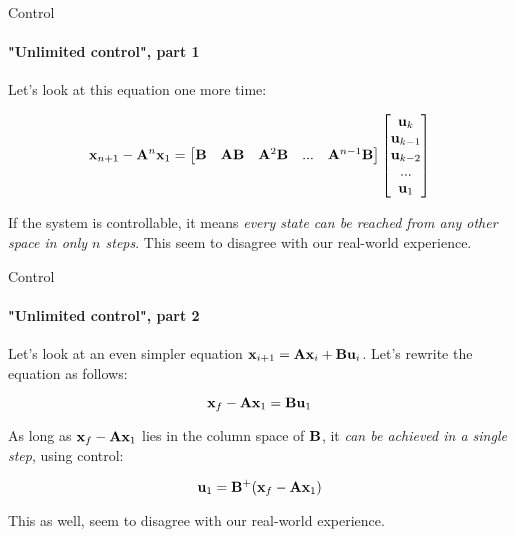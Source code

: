 \documentclass{beamer}
\begin{document}
\begin{frame}{Control}
\framesubtitle{"Unlimited control", part 1}
\begin{flushleft}

Let's look at this equation one more time:

\begin{equation}
    \mathbf{x}_{n+1} - \mathbf{A}^n \mathbf{x}_1 = 
    \begin{bmatrix}
    \mathbf{B} &
    \mathbf{A} \mathbf{B} &
    \mathbf{A}^2 \mathbf{B} & ... &
    \mathbf{A}^{n - 1} \mathbf{B}
    \end{bmatrix}    
    \begin{bmatrix}
    \mathbf{u}_{k} \\
    \mathbf{u}_{k-1} \\
    \mathbf{u}_{k-2} \\ ... \\
    \mathbf{u}_{1}
    \end{bmatrix}
\end{equation}

If the system is controllable, it means \emph{every state can be reached from any other space in only $n$ steps}. This seem to disagree with our real-world experience.

\end{flushleft}
\end{frame}




\begin{frame}{Control}
\framesubtitle{"Unlimited control", part 2}
\begin{flushleft}

Let's look at an even simpler equation $\mathbf{x}_{i+1} = \mathbf{A}  \mathbf{x}_i + \mathbf{B} \mathbf{u}_i$. Let's rewrite the equation as follows:

\begin{equation}
\mathbf{x}_f - \mathbf{A} \mathbf{x}_1 = \mathbf{B} \mathbf{u}_1
\end{equation}

As long as $\mathbf{x}_f - \mathbf{A} \mathbf{x}_1$ lies in the column space of $\mathbf{B}$, it \emph{can be achieved in a single step}, using control:

\begin{equation}
\mathbf{u}_1 = \mathbf{B}^+ (\mathbf{x}_f - \mathbf{A} \mathbf{x}_1)
\end{equation}

This as well, seem to disagree with our real-world experience.

\end{flushleft}
\end{frame}
\end{document}
